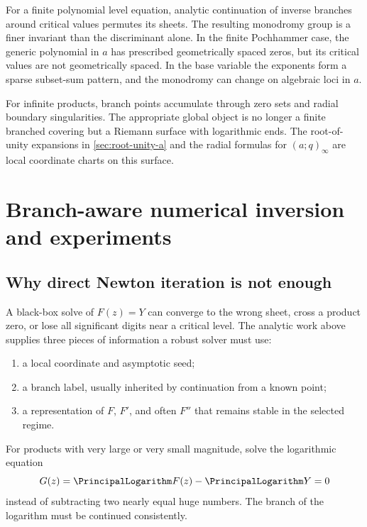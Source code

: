 \documentclass[11pt,a4paper,oneside,openany]{book}
\theoremstyle{definition}
\theoremstyle{remark}
\begin{document}
For a finite polynomial level equation, analytic continuation of inverse
branches around critical values permutes its sheets.  The resulting monodromy
group is a finer invariant than the discriminant alone.  In the finite
Pochhammer case, the generic polynomial in \(a\) has prescribed geometrically
spaced zeros, but its critical values are not geometrically spaced.  In the
base variable the exponents form a sparse subset-sum pattern, and the
monodromy can change on algebraic loci in \(a\).

For infinite products, branch points accumulate through zero sets and radial
boundary singularities.  The appropriate global object is no longer a finite
branched covering but a Riemann surface with logarithmic ends.  The
root-of-unity expansions in \cref{sec:root-unity-a} and the radial formulas
for \((a;q)_\infty\) are local coordinate charts on this surface.

\chapter{Branch-aware numerical inversion and experiments}

\section{Why direct Newton iteration is not enough}

A black-box solve of \(F(z)=Y\) can converge to the wrong sheet, cross a
product zero, or lose all significant digits near a critical level.  The
analytic work above supplies three pieces of information a robust solver must
use:
\begin{enumerate}[label=\textup{(\roman*)}]
\item a local coordinate and asymptotic seed;
\item a branch label, usually inherited by continuation from a known point;
\item a representation of \(F\), \(F'\), and often \(F''\) that remains
stable in the selected regime.
\end{enumerate}

For products with very large or very small magnitude, solve the logarithmic
equation
\begin{equation}\label{eq:logarithmic-residual}
 G(z)=\PrincipalLogarithm F(z)-\PrincipalLogarithm Y=0
\end{equation}
instead of subtracting two nearly equal huge numbers.  The branch of the
logarithm must be continued consistently.
\end{document}
